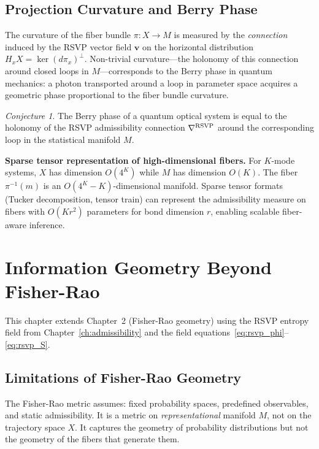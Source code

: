 \documentclass[11pt, openright, twoside]{book}
\theoremstyle{plain}
\theoremstyle{definition}
\theoremstyle{remark}
\newtheorem{conjecture}[theorem]{Conjecture}
\newcommand{\vfield}{\mathbf{v}}
\newcommand{\Traj}{X}
\newcommand{\Rep}{M}
\newcommand{\proj}{\pi}
\begin{document}
\section{Projection Curvature and Berry Phase}

The curvature of the fiber bundle $\proj:\Traj\to\Rep$ is measured by the \emph{connection}
induced by the RSVP vector field $\vfield$ on the horizontal distribution
$H_x\Traj = \ker(d\proj_x)^\perp$. Non-trivial curvature---the holonomy of this
connection around closed loops in $\Rep$---corresponds to the Berry phase in quantum
mechanics: a photon transported around a loop in parameter space acquires a geometric
phase proportional to the fiber bundle curvature.

\begin{conjecture}
The Berry phase of a quantum optical system is equal to the holonomy of the RSVP
admissibility connection $\nabla^{\rm RSVP}$ around the corresponding loop in
the statistical manifold $\Rep$.
\end{conjecture}

\begin{implbox}
\textbf{Sparse tensor representation of high-dimensional fibers.} For $K$-mode systems,
$\Traj$ has dimension $O(4^K)$ while $\Rep$ has dimension $O(K)$. The fiber
$\proj^{-1}(m)$ is an $O(4^K-K)$-dimensional manifold. Sparse tensor formats (Tucker
decomposition, tensor train) can represent the admissibility measure on fibers with
$O(Kr^2)$ parameters for bond dimension $r$, enabling scalable fiber-aware inference.
\end{implbox}

\chapter{Information Geometry Beyond Fisher-Rao}

\begin{depbox}
This chapter extends Chapter~2 (Fisher-Rao geometry) using the RSVP entropy field from
Chapter~\ref{ch:admissibility} and the field equations~\eqref{eq:rsvp_phi}--\eqref{eq:rsvp_S}.
\end{depbox}

\section{Limitations of Fisher-Rao Geometry}

The Fisher-Rao metric assumes: fixed probability spaces, predefined observables, and static
admissibility. It is a metric on \emph{representational} manifold $\Rep$, not on the
trajectory space $\Traj$. It captures the geometry of probability distributions but not
the geometry of the fibers that generate them.
\end{document}
